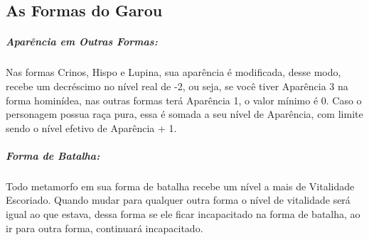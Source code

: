 \subsection{\bf As Formas do Garou}

\subparagraph{\bf Aparência em Outras Formas:}
Nas formas Crinos, Hispo e Lupina, sua aparência é modificada, desse modo, recebe um decréscimo no nível real de -2, ou seja, se você tiver Aparência 3 na forma hominídea, nas outras formas terá Aparência 1, o valor mínimo é 0. Caso o personagem possua raça pura, essa é somada a seu nível de Aparência, com limite sendo o nível efetivo de Aparência + 1.

\subparagraph{\bf Forma de Batalha:}
Todo metamorfo em sua forma de batalha recebe um nível a mais de Vitalidade Escoriado. Quando mudar para qualquer outra forma o nível de vitalidade será igual ao que estava, dessa forma se ele ficar incapacitado na forma de batalha, ao ir para outra forma, continuará incapacitado.